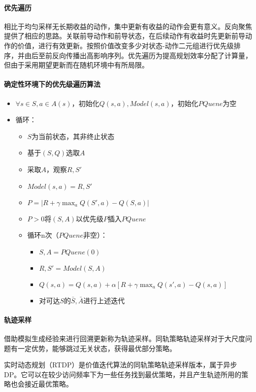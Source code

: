 \documentclass[
12pt, %
a4paper, 
oneside, %
headinclude,footinclude, %
]{scrartcl}
\begin{document}
\paragraph{优先遍历}
相比于均匀采样无长期收益的动作，集中更新有收益的动作会更有意义。反向聚焦提供了相应的思路。关联前导动作和前导状态，在后续动作有收益时先更新前导动作的价值，进行有效更新。按照价值改变多少对状态-动作二元组进行优先级排序，并由后至前反向传播出高影响序列。优先遍历为提高规划效率分配了计算量，但由于采用期望更新而在随机环境中有所局限。
\paragraph{确定性环境下的优先级遍历算法}
\begin{itemize}
\item $ \forall s \in S, a \in A(s) $，初始化$ Q(s, a),Model(s, a) $，初始化$ PQuene $为空
\item 循环：
\begin{itemize}
\item $ S $为当前状态，其非终止状态
\item 基于$ (S, Q) $选取$ A $
\item 采取$ A $，观察$ R,S' $
\item $ Model(s, a) = R,S' $
\item $ P = |R + \gamma \max_a Q(S',a) - Q(S,a)| $
\item $ P > 0 $将$ (S,A) $以优先级$ P $插入$ PQuene $
\item 循环n次（$ PQuene $非空）：
\begin{itemize}
\item $ S,A = PQuene(0) $ 
\item $ R,S' = Model(S, A) $
\item $ Q(s, a) = Q(s, a) + \alpha[R + \gamma \max_aQ(s', a) - Q(s, a)] $
\item 对可达$ S $的$ \bar{S},\bar{A} $进行上述迭代
\end{itemize}
\end{itemize}
\end{itemize}
\paragraph{轨迹采样}
借助模拟生成经验来进行回溯更新称为轨迹采样。同轨策略轨迹采样对于大尺度问题有一定优势，能够跳过无关状态，获得最优部分策略。

实时动态规划（RTDP）是价值迭代算法的同轨策略轨迹采样版本，属于异步DP。它可以在较少访问频率下为一些任务找到最优策略，并且产生轨迹所用的策略也会接近最优策略。
\end{document}
